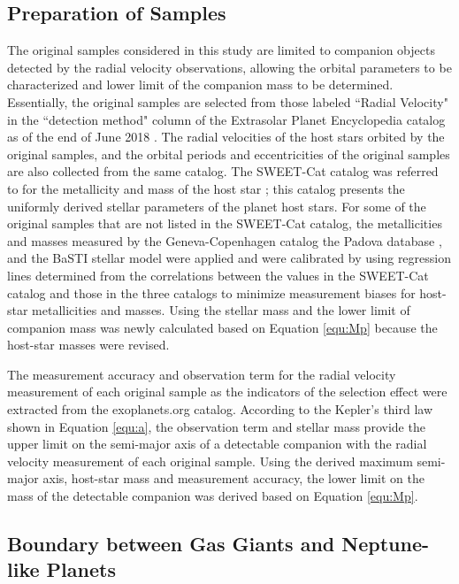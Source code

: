 \documentclass[twocolumn, dvipdfmx]{aastex62}
\begin{document}
\begin{CJK*}{UTF8}{min}
\subsection{Preparation of Samples} \label{subsec:preparation}

The original samples considered in this study are limited to companion objects detected by the radial velocity observations, allowing the orbital parameters to be characterized and lower limit of the companion mass to be determined. Essentially, the original samples are selected from those labeled ``Radial Velocity" in the ``detection method" column of the Extrasolar Planet Encyclopedia catalog as of the end of June 2018 \citep{2011A&A...532A..79S}. The radial velocities of the host stars orbited by the original samples, and the orbital periods and eccentricities of the original samples are also collected from the same catalog. The SWEET-Cat catalog was referred to for the metallicity and mass of the host star \citep{2013A&A...556A.150S, 2018A&A...620A..58S}; this catalog presents the uniformly derived stellar parameters of the planet host stars. For some of the original samples that are not listed in the SWEET-Cat catalog, the metallicities and masses measured by the Geneva-Copenhagen catalog \citep{2011A&A...530A.138C} the Padova database \citep{2000A&AS..141..371G}, and the BaSTI stellar model \citep{2018ApJ...856..125H} were applied and were calibrated by using regression lines determined from the correlations between the values in the SWEET-Cat catalog and those in the three catalogs to minimize measurement biases for host-star metallicities and masses. Using the stellar mass and the lower limit of companion mass was newly calculated based on Equation \ref{equ:Mp} because the host-star masses were revised.

The measurement accuracy and observation term for the radial velocity measurement of each original sample as the indicators of the selection effect were extracted from the exoplanets.org catalog. According to the Kepler's third law shown in Equation \ref{equ:a}, the observation term and stellar mass provide the upper limit on the semi-major axis of a detectable companion with the radial velocity measurement of each original sample. Using the derived maximum semi-major axis, host-star mass and measurement accuracy, the lower limit on the mass of the detectable companion was derived based on Equation \ref{equ:Mp}.


\subsection{Boundary between Gas Giants and Neptune-like Planets} \label{subsec:boundary}


\end{CJK*}
\end{document}

